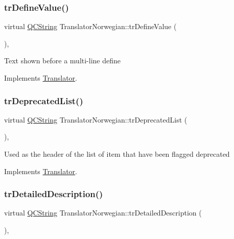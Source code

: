 \subsubsection{\texorpdfstring{trDefineValue()}{trDefineValue()}}
{\footnotesize\ttfamily virtual \mbox{\hyperlink{class_q_c_string}{Q\+C\+String}} Translator\+Norwegian\+::tr\+Define\+Value (\begin{DoxyParamCaption}{ }\end{DoxyParamCaption})\hspace{0.3cm}{\ttfamily [inline]}, {\ttfamily [virtual]}}

Text shown before a multi-\/line define 

Implements \mbox{\hyperlink{class_translator}{Translator}}.

\mbox{\label{class_translator_norwegian_a7d8a0ed6dc7d5e3163a2a31fc3fd23e3}} 
\subsubsection{\texorpdfstring{trDeprecatedList()}{trDeprecatedList()}}
{\footnotesize\ttfamily virtual \mbox{\hyperlink{class_q_c_string}{Q\+C\+String}} Translator\+Norwegian\+::tr\+Deprecated\+List (\begin{DoxyParamCaption}{ }\end{DoxyParamCaption})\hspace{0.3cm}{\ttfamily [inline]}, {\ttfamily [virtual]}}

Used as the header of the list of item that have been flagged deprecated 

Implements \mbox{\hyperlink{class_translator}{Translator}}.

\mbox{\label{class_translator_norwegian_a476ed972e3fb7cf19b44d1e60ccdb0b4}} 
\subsubsection{\texorpdfstring{trDetailedDescription()}{trDetailedDescription()}}
{\footnotesize\ttfamily virtual \mbox{\hyperlink{class_q_c_string}{Q\+C\+String}} Translator\+Norwegian\+::tr\+Detailed\+Description (\begin{DoxyParamCaption}{ }\end{DoxyParamCaption})\hspace{0.3cm}{\ttfamily [inline]}, {\ttfamily [virtual]}}

